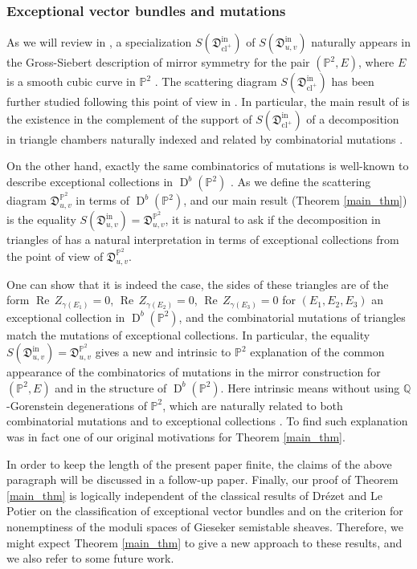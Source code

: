 \documentclass[12pt, a4paper]{amsart}
\newcommand\PP{\mathbb P}
\newcommand\fD{\mathfrak D}
\newcommand\Rea{\operatorname{Re}\,}
\newcommand\cl{\operatorname{cl}}
\newcommand\D{\operatorname{D}}
\newcommand\iin{\mathrm{in}}
\begin{document}
\subsubsection{Exceptional vector bundles and mutations}
\label{section_exceptional}
As we will review in \cite[\S 3]{bousseau2019takahashi}, a specialization $S(\fD^\iin_{\cl^+})$
of $S(\fD^\iin_{u,v})$ naturally appears in the Gross-Siebert description of mirror symmetry for the pair 
$(\PP^2,E)$, where $E$ is a smooth cubic curve in $\PP^2$ \cite{cps}. 
The scattering diagram
$S(\fD^\iin_{\cl^+})$ has been further studied following this point of view in 
\cite{MR4038403}. In particular, the main result of \cite{MR4038403}
is the existence in the complement of the support of $S(\fD^\iin_{\cl^+})$ of a decomposition in triangle chambers naturally 
indexed and related by combinatorial mutations \cite{MR3007265}. 

On the other hand, exactly the same combinatorics of mutations is well-known to describe exceptional collections in 
$\D^b(\PP^2)$  \cite{MR816365, MR849052, 
MR916199, MR885779, MR936525}. 
As we define the scattering diagram
$\fD^{\PP^2}_{u,v}$ in terms of $\D^b(\PP^2)$, and our main result (Theorem \ref{main_thm}) is the equality 
$S(\fD^\iin_{u,v})=\fD^{\PP^2}_{u,v}$, it is natural to ask if the decomposition in triangles of \cite{MR4038403} has a
natural interpretation in terms of exceptional collections from the point of view of $\fD^{\PP^2}_{u,v}$. 

One can show that it is indeed the case, the sides of these triangles are of the form 
$\Rea Z_{\gamma(E_1)}=0$, $\Rea Z_{\gamma(E_2)}=0$, $\Rea Z_{\gamma(E_3)}=0$ for $(E_1,E_2,E_3)$ an exceptional collection in $\D^b(\PP^2)$, and the combinatorial mutations of triangles match the mutations of exceptional collections.
In particular, the equality $S(\fD^\iin_{u,v})=\fD^{\PP^2}_{u,v}$ gives a new and intrinsic to $\PP^2$ explanation of the common appearance of the combinatorics of mutations in the mirror construction for $(\PP^2,E)$ and in the structure of $\D^b(\PP^2)$. Here intrinsic means without using $\mathbb{Q}$-Gorenstein degenerations of $\PP^2$, which are naturally related to both combinatorial mutations and to exceptional collections \cite{MR3053568}. To find such explanation was in fact one of our original motivations for Theorem \ref{main_thm}.

In order to keep the length of the present paper finite, the claims of the above paragraph will be discussed in a follow-up paper. Finally,
 our proof of Theorem \ref{main_thm} 
is logically independent of the classical results of Dr\'ezet and Le Potier \cite{MR816365} on the classification of exceptional vector bundles and on the criterion for nonemptiness of the moduli spaces of Gieseker semistable sheaves. Therefore, we might expect Theorem \ref{main_thm} to give a new approach to these results, and we also refer to some future work. 
\end{document}

